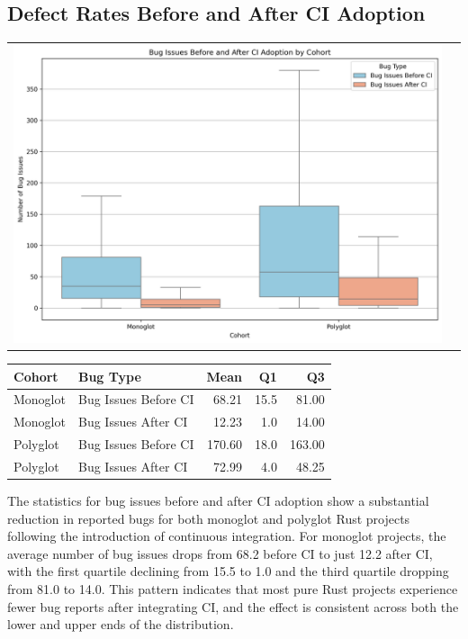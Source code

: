 \documentclass[11pt]{article}
\begin{document}
\subsection{Defect Rates Before and After CI Adoption}
\begin{tabularx}{\linewidth}{@{}XX@{}}
\includegraphics[width=\linewidth]{figures/bugs_before_after_ci_by_cohort.jpg}
\end{tabularx}
\begin{center}
\begin{tabular}{llrrr}
Cohort & Bug Type & Mean & Q1 & Q3\\
\hline
Monoglot & Bug Issues Before CI & 68.21 & 15.5 & 81.00\\
Monoglot & Bug Issues After CI & 12.23 & 1.0 & 14.00\\
Polyglot & Bug Issues Before CI & 170.60 & 18.0 & 163.00\\
Polyglot & Bug Issues After CI & 72.99 & 4.0 & 48.25\\
\end{tabular}
\end{center}
The statistics for bug issues before and after CI adoption show a substantial reduction in reported bugs for both monoglot and polyglot Rust projects following the introduction of continuous integration. For monoglot projects, the average number of bug issues drops from 68.2 before CI to just 12.2 after CI, with the first quartile declining from 15.5 to 1.0 and the third quartile dropping from 81.0 to 14.0. This pattern indicates that most pure Rust projects experience fewer bug reports after integrating CI, and the effect is consistent across both the lower and upper ends of the distribution.
\end{document}
